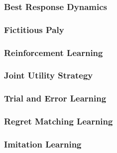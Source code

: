\subsubsection{Best Response Dynamics}
\subsubsection{Fictitious Paly}
\subsubsection{Reinforcement Learning}
\subsubsection{Joint Utility Strategy}
\subsubsection{Trial and Error Learning}
\subsubsection{Regret Matching Learning}
\subsubsection{Imitation Learning}


